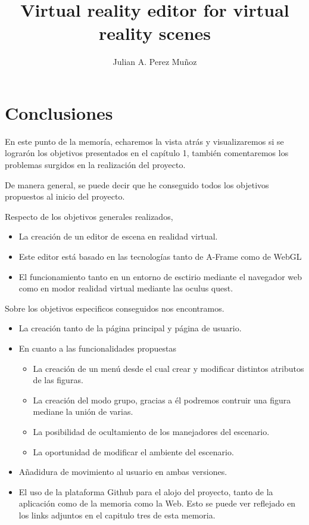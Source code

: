 \documentclass[a4paper, 12pt]{book}
\title{Virtual reality editor for virtual reality scenes}
\author{Julian A. Perez Muñoz}
\begin{document}

\cleardoublepage

\cleardoublepage
\chapter{Conclusiones}
\label{chap:conclusiones}
En este punto de la memoría, echaremos la vista atrás y visualizaremos si se lograrón los objetivos presentados en el capítulo 1, también comentaremos los problemas surgidos en la realización del proyecto.

De manera general, se puede decir que he conseguido todos los objetivos propuestos al inicio del proyecto.

Respecto de los objetivos generales realizados, 

\begin{itemize}
    \item La creación de un editor de escena en realidad virtual.
    \item Este editor está basado en las tecnologías tanto de A-Frame como de WebGL
    \item El funcionamiento tanto en un entorno de esctirio mediante el navegador web como en modor realidad virtual mediante las oculus quest.
\end{itemize}

Sobre los objetivos especificos conseguidos nos encontramos. 
\begin{itemize}
    \item La creación tanto de la página principal y página de usuario.
    \item En cuanto a las funcionalidades propuestas
    \begin{itemize}
        \item La creación de un menú desde el cual crear y modificar distintos atributos de las figuras.
        \item La creación del modo grupo, gracias a él podremos contruir una figura mediane la unión de varias.
        \item La posibilidad de ocultamiento de los manejadores del escenario.
        \item La oportunidad de modificar el ambiente del escenario.
    \end{itemize}
    \item Añadidura de movimiento al usuario en ambas versiones.
    \item El uso de la plataforma Github para el alojo del proyecto, tanto de la aplicación como de la memoria como la Web. Esto se puede ver reflejado en los links adjuntos en el capitulo tres de esta memoria.
\end{itemize}
\end{document}
